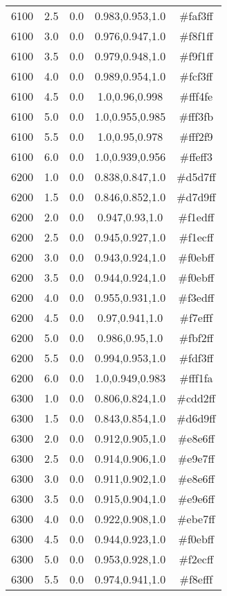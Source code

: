 \begin{tabular}{ccccc}
6100 & 2.5 & 0.0 & 0.983,0.953,1.0 & \#faf3ff \\ 
6100 & 3.0 & 0.0 & 0.976,0.947,1.0 & \#f8f1ff \\ 
6100 & 3.5 & 0.0 & 0.979,0.948,1.0 & \#f9f1ff \\ 
6100 & 4.0 & 0.0 & 0.989,0.954,1.0 & \#fcf3ff \\ 
6100 & 4.5 & 0.0 & 1.0,0.96,0.998 & \#fff4fe \\ 
6100 & 5.0 & 0.0 & 1.0,0.955,0.985 & \#fff3fb \\ 
6100 & 5.5 & 0.0 & 1.0,0.95,0.978 & \#fff2f9 \\ 
6100 & 6.0 & 0.0 & 1.0,0.939,0.956 & \#ffeff3 \\ 
6200 & 1.0 & 0.0 & 0.838,0.847,1.0 & \#d5d7ff \\ 
6200 & 1.5 & 0.0 & 0.846,0.852,1.0 & \#d7d9ff \\ 
6200 & 2.0 & 0.0 & 0.947,0.93,1.0 & \#f1edff \\ 
6200 & 2.5 & 0.0 & 0.945,0.927,1.0 & \#f1ecff \\ 
6200 & 3.0 & 0.0 & 0.943,0.924,1.0 & \#f0ebff \\ 
6200 & 3.5 & 0.0 & 0.944,0.924,1.0 & \#f0ebff \\ 
6200 & 4.0 & 0.0 & 0.955,0.931,1.0 & \#f3edff \\ 
6200 & 4.5 & 0.0 & 0.97,0.941,1.0 & \#f7efff \\ 
6200 & 5.0 & 0.0 & 0.986,0.95,1.0 & \#fbf2ff \\ 
6200 & 5.5 & 0.0 & 0.994,0.953,1.0 & \#fdf3ff \\ 
6200 & 6.0 & 0.0 & 1.0,0.949,0.983 & \#fff1fa \\ 
6300 & 1.0 & 0.0 & 0.806,0.824,1.0 & \#cdd2ff \\ 
6300 & 1.5 & 0.0 & 0.843,0.854,1.0 & \#d6d9ff \\ 
6300 & 2.0 & 0.0 & 0.912,0.905,1.0 & \#e8e6ff \\ 
6300 & 2.5 & 0.0 & 0.914,0.906,1.0 & \#e9e7ff \\ 
6300 & 3.0 & 0.0 & 0.911,0.902,1.0 & \#e8e6ff \\ 
6300 & 3.5 & 0.0 & 0.915,0.904,1.0 & \#e9e6ff \\ 
6300 & 4.0 & 0.0 & 0.922,0.908,1.0 & \#ebe7ff \\ 
6300 & 4.5 & 0.0 & 0.944,0.923,1.0 & \#f0ebff \\ 
6300 & 5.0 & 0.0 & 0.953,0.928,1.0 & \#f2ecff \\ 
6300 & 5.5 & 0.0 & 0.974,0.941,1.0 & \#f8efff \\ 

\end{tabular}
